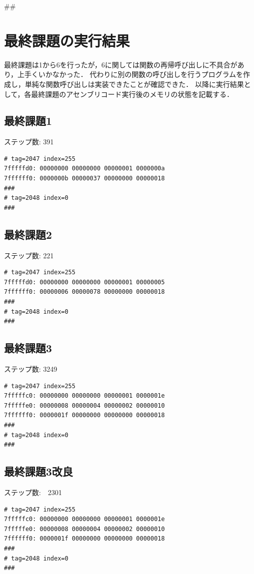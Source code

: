\documentclass[a4paper,11pt]{jarticle}
\begin{document}
{##
\section{最終課題の実行結果}
最終課題は1から6を行ったが，6に関しては関数の再帰呼び出しに不具合があり，上手くいかなかった．
代わりに別の関数の呼び出しを行うプログラムを作成し，単純な関数呼び出しは実装できたことが確認できた．
以降に実行結果として，各最終課題のアセンブリコード実行後のメモリの状態を記載する．
\subsection{最終課題1}
ステップ数: 391 
\begin{verbatim}
# tag=2047 index=255
7fffffd0: 00000000 00000000 00000001 0000000a
7ffffff0: 0000000b 00000037 00000000 00000018
###
# tag=2048 index=0
###
\end{verbatim}
\subsection{最終課題2}
ステップ数: 221 
\begin{verbatim}
# tag=2047 index=255
7fffffd0: 00000000 00000000 00000001 00000005
7ffffff0: 00000006 00000078 00000000 00000018
###
# tag=2048 index=0
###
\end{verbatim}
\subsection{最終課題3}
ステップ数: 3249 
\begin{verbatim}
# tag=2047 index=255
7fffffc0: 00000000 00000000 00000001 0000001e
7fffffe0: 00000008 00000004 00000002 00000010
7ffffff0: 0000001f 00000000 00000000 00000018
###
# tag=2048 index=0
###
\end{verbatim}
\subsection{最終課題3改良}
ステップ数:　2301
\begin{verbatim}
# tag=2047 index=255
7fffffc0: 00000000 00000000 00000001 0000001e
7fffffe0: 00000008 00000004 00000002 00000010
7ffffff0: 0000001f 00000000 00000000 00000018
###
# tag=2048 index=0
###

\end{verbatim}
}
\end{document}
